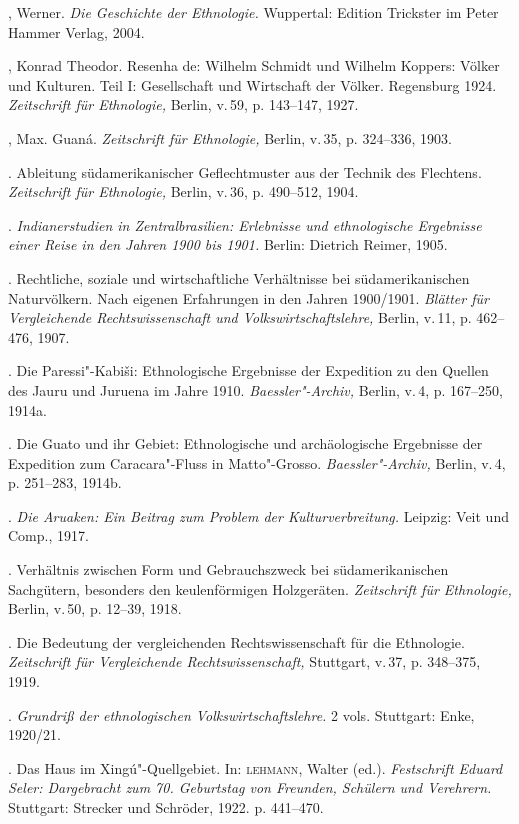 \begin{bibliohedra}
, Werner. \textit{Die Geschichte der Ethnologie.} Wuppertal:
Edition Trickster im Peter Hammer Verlag, 2004.

, Konrad Theodor. Resenha de: Wilhelm Schmidt und Wilhelm Koppers:
Völker und Kulturen. Teil I: Gesellschaft und Wirtschaft der Völker.
Regensburg 1924. \textit{Zeitschrift für Ethnologie,} Berlin, v.\,59, p.
143--147, 1927.

, Max. Guaná. \textit{Zeitschrift für Ethnologie,} Berlin, v.\,35,
p. 324--336, 1903.

\titidem. Ableitung südamerikanischer Geflechtmuster aus der
Technik des Flechtens. \textit{Zeitschrift für Ethnologie,} Berlin, v.\,36, p. 490--512, 1904.

\titidem. \textit{Indianerstudien in Zentralbrasilien:
Erlebnisse und ethnologische Ergebnisse einer Reise in den Jahren 1900
bis 1901.} Berlin: Dietrich Reimer, 1905.

\titidem. Rechtliche, soziale und wirtschaftliche
Verhältnisse bei südamerikanischen Naturvölkern. Nach eigenen
Erfahrungen in den Jahren 1900/1901. \textit{Blätter für Vergleichende
Rechtswissenschaft und Volkswirtschaftslehre,} Berlin, v.\,11, p.
462--476, 1907.

\titidem. Die Paressi"-Kabiši: Ethnologische Ergebnisse der
Expedition zu den Quellen des Jauru und Juruena im Jahre 1910.
\textit{Baessler"-Archiv,} Berlin, v.\,4, p. 167--250, 1914a.

\titidem. Die Guato und ihr Gebiet: Ethnologische und
archäologische Ergebnisse der Expedition zum Caracara"-Fluss in
Matto"-Grosso. \textit{Baessler"-Archiv,} Berlin, v.\,4, p. 251--283, 1914b.

\titidem. \textit{Die Aruaken: Ein Beitrag zum Problem der
Kulturverbreitung.} Leipzig: Veit und Comp., 1917.

\titidem. Verhältnis zwischen Form und Gebrauchszweck bei
südamerikanischen Sachgütern, besonders den keulenförmigen Holzgeräten.
\textit{Zeitschrift für Ethnologie,} Berlin, v.\,50, p. 12--39, 1918.

\titidem. Die Bedeutung der vergleichenden
Rechtswissenschaft für die Ethnologie. \textit{Zeitschrift für
Vergleichende Rechtswissenschaft,} Stuttgart, v.\,37, p. 348--375, 1919.

\titidem. \textit{Grundriß der ethnologischen
Volkswirtschaftslehre.} 2 vols. Stuttgart: Enke, 1920/21.

\titidem. Das Haus im Xingú"-Quellgebiet. In: \textsc{lehmann}, Walter
(ed.). \textit{Festschrift Eduard Seler: Dargebracht zum 70. Geburtstag
von Freunden, Schülern und Verehrern.} Stuttgart: Strecker und Schröder,
1922. p. 441--470.


\end{bibliohedra}
